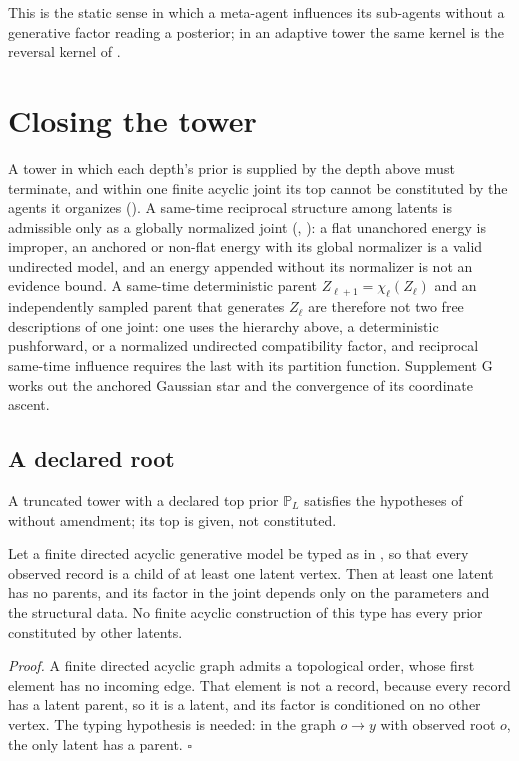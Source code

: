 This is the static sense in which a meta-agent influences its sub-agents without a
generative factor reading a posterior; in an adaptive tower the same kernel is the
reversal kernel of .

\section{Closing the tower}
\label{sec:full-graph-closing-tower}

A tower in which each depth's prior is supplied by the depth above must terminate, and
within one finite acyclic joint its top cannot be constituted by the agents it
organizes (). A same-time reciprocal
structure among latents is admissible only as a globally normalized joint
(, ): a flat unanchored
energy is improper, an anchored or non-flat energy with its global normalizer is a
valid undirected model, and an energy appended without its normalizer is not an
evidence bound. A same-time deterministic parent $Z_{\ell+1}=\chi_\ell(Z_\ell)$ and an
independently sampled parent that generates $Z_\ell$ are therefore not two free
descriptions of one joint: one uses the hierarchy above, a deterministic pushforward,
or a normalized undirected compatibility factor, and reciprocal same-time influence
requires the last with its partition function. Supplement G works out the anchored
Gaussian star and the convergence of its coordinate ascent.

\subsection{A declared root}
\label{sec:obs-survives}

A truncated tower with a declared top prior $\mathbb P_L$ satisfies the hypotheses of
 without amendment; its top is given, not constituted.

Let a finite directed acyclic generative model be typed as in , so
that every observed record is a child of at least one latent vertex. Then at least one
latent has no parents, and its factor in the joint depends only on the parameters and
the structural data. No finite acyclic construction of this type has every prior
constituted by other latents. 

\noindent\emph{Proof.}
A finite directed acyclic graph admits a topological order, whose first element has
no incoming edge. That element is not a record, because every record has a latent
parent, so it is a latent, and its factor is conditioned on no other vertex. The typing
hypothesis is needed: in the graph $o\to y$ with observed root $o$, the only latent has
a parent. $\square$

